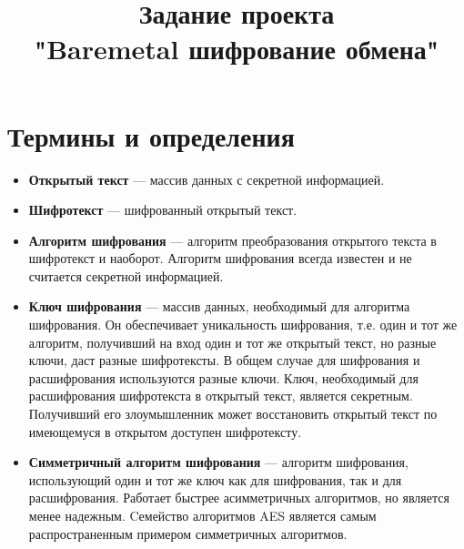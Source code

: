 \documentclass[14pt]{extarticle}
\title{Задание проекта \\ "Baremetal шифрование обмена"}
\begin{document}
\maketitle

\tableofcontents

\clearpage

\section{Термины и определения}

\begin{itemize}

 \item \textbf{Открытый текст} --- массив данных с секретной информацией\footnotemark{}.


 \item \textbf{Шифротекст} --- шифрованный открытый текст\footnotemark{}.


 \item \textbf{Алгоритм шифрования} --- алгоритм преобразования открытого текста
  в шифротекст и наоборот\footnotemark{}.
  Алгоритм шифрования всегда известен и не считается секретной информацией.


 \item \textbf{Ключ шифрования} --- массив данных, необходимый для алгоритма
  шифрования\footnotemark{}.
  Он обеспечивает уникальность шифрования, т.е. один и тот же алгоритм, получивший
  на вход один и тот же открытый текст, но разные ключи, даст разные шифротексты.
  В общем случае для шифрования и расшифрования используются разные ключи.
  Ключ, необходимый для расшифрования шифротекста в открытый текст, является секретным.
  Получивший его злоумышленник может восстановить открытый текст по имеющемуся
  в открытом доступен шифротексту.


 \item \textbf{Симметричный алгоритм шифрования} --- алгоритм шифрования,
  использующий один и тот же ключ как для шифрования, так и для расшифрования.
  Работает быстрее асимметричных алгоритмов, но является менее надежным.
  Cемейство алгоритмов AES\footnotemark{} является самым распространенным примером симметричных
  алгоритмов.


\end{itemize}
\end{document}

